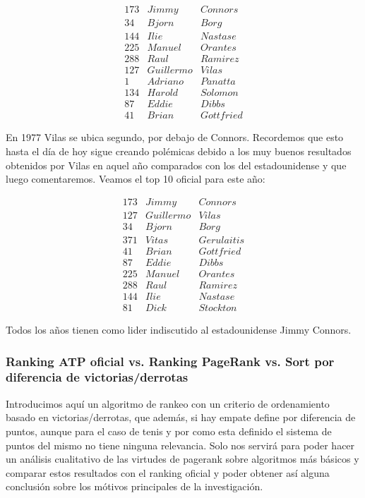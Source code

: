 \begin{eqnarray*}
173 & Jimmy & Connors \\
34 & Bjorn & Borg \\
144 & Ilie & Nastase \\
225 & Manuel & Orantes \\
288 & Raul & Ramirez \\
127 & Guillermo & Vilas \\
1 & Adriano & Panatta \\
134 & Harold & Solomon \\
87 & Eddie & Dibbs \\
41 & Brian & Gottfried 
\end{eqnarray*}

En 1977 Vilas se ubica segundo, por debajo de Connors. Recordemos que esto hasta el día de hoy sigue creando polémicas debido a los muy buenos resultados obtenidos por Vilas en aquel año comparados con los del estadounidense y que luego comentaremos.
Veamos el top 10 oficial para este año:

\begin{eqnarray*}
173 & Jimmy & Connors \\
127 & Guillermo & Vilas \\
34 & Bjorn & Borg \\
371 & Vitas & Gerulaitis \\
41 & Brian & Gottfried \\
87 & Eddie & Dibbs \\
225 & Manuel & Orantes \\
288 & Raul & Ramirez \\
144 & Ilie & Nastase \\
81 & Dick & Stockton 
\end{eqnarray*}

Todos los años tienen como lider indiscutido al estadounidense Jimmy Connors.

\subsubsection{Ranking ATP oficial vs. Ranking PageRank vs. Sort por diferencia de victorias/derrotas}

Introducimos aquí un algoritmo de rankeo con un criterio de ordenamiento basado en victorias/derrotas, que además, si hay empate define por diferencia de puntos, aunque para el caso de tenis y por como esta definido el sistema de puntos del mismo no tiene ninguna relevancia. Solo nos servirá para poder hacer un análisis cualitativo de las virtudes de pagerank sobre algoritmos más básicos y comparar estos resultados con el ranking oficial y poder obtener así alguna conclusión sobre los mótivos principales de la investigación.

